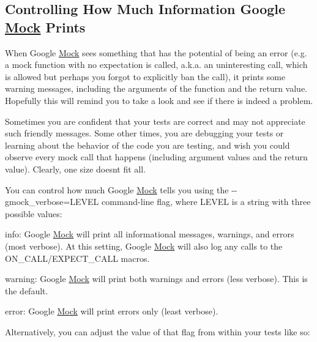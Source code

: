 \subsection*{Controlling How Much Information Google \mbox{\hyperlink{class_mock}{Mock}} Prints}

When Google \mbox{\hyperlink{class_mock}{Mock}} sees something that has the potential of being an error (e.\+g. a mock function with no expectation is called, a.\+k.\+a. an uninteresting call, which is allowed but perhaps you forgot to explicitly ban the call), it prints some warning messages, including the arguments of the function and the return value. Hopefully this will remind you to take a look and see if there is indeed a problem.

Sometimes you are confident that your tests are correct and may not appreciate such friendly messages. Some other times, you are debugging your tests or learning about the behavior of the code you are testing, and wish you could observe every mock call that happens (including argument values and the return value). Clearly, one size doesn\textquotesingle{}t fit all.

You can control how much Google \mbox{\hyperlink{class_mock}{Mock}} tells you using the {\ttfamily -\/-\/gmock\+\_\+verbose=L\+E\+V\+EL} command-\/line flag, where {\ttfamily L\+E\+V\+EL} is a string with three possible values\+:


\begin{DoxyItemize}
\item {\ttfamily info}\+: Google \mbox{\hyperlink{class_mock}{Mock}} will print all informational messages, warnings, and errors (most verbose). At this setting, Google \mbox{\hyperlink{class_mock}{Mock}} will also log any calls to the {\ttfamily O\+N\+\_\+\+C\+A\+L\+L/\+E\+X\+P\+E\+C\+T\+\_\+\+C\+A\+LL} macros.
\item {\ttfamily warning}\+: Google \mbox{\hyperlink{class_mock}{Mock}} will print both warnings and errors (less verbose). This is the default.
\item {\ttfamily error}\+: Google \mbox{\hyperlink{class_mock}{Mock}} will print errors only (least verbose).
\end{DoxyItemize}

Alternatively, you can adjust the value of that flag from within your tests like so\+:


\begin{DoxyCode}{0}
\end{DoxyCode}


